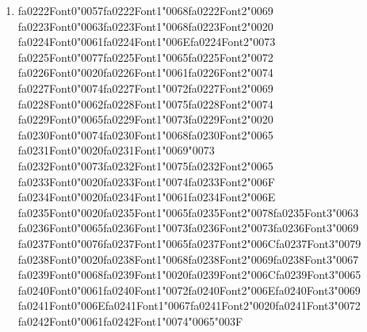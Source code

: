 \documentclass[12pt]{article}
\begin{document}
\begin{enumerate}[label=Q\arabic*.]
 \item {\csname fa0222Font0\endcsname\char"0057}{\csname fa0222Font1\endcsname\char"0068}{\csname fa0222Font2\endcsname\char"0069} {\csname fa0223Font0\endcsname\char"0063}{\csname fa0223Font1\endcsname\char"0068}{\csname fa0223Font2\endcsname\char"0020} {\csname fa0224Font0\endcsname\char"0061}{\csname fa0224Font1\endcsname\char"006E}{\csname fa0224Font2\endcsname\char"0073} {\csname fa0225Font0\endcsname\char"0077}{\csname fa0225Font1\endcsname\char"0065}{\csname fa0225Font2\endcsname\char"0072} {\csname fa0226Font0\endcsname\char"0020}{\csname fa0226Font1\endcsname\char"0061}{\csname fa0226Font2\endcsname\char"0074} {\csname fa0227Font0\endcsname\char"0074}{\csname fa0227Font1\endcsname\char"0072}{\csname fa0227Font2\endcsname\char"0069} {\csname fa0228Font0\endcsname\char"0062}{\csname fa0228Font1\endcsname\char"0075}{\csname fa0228Font2\endcsname\char"0074} {\csname fa0229Font0\endcsname\char"0065}{\csname fa0229Font1\endcsname\char"0073}{\csname fa0229Font2\endcsname\char"0020} {\csname fa0230Font0\endcsname\char"0074}{\csname fa0230Font1\endcsname\char"0068}{\csname fa0230Font2\endcsname\char"0065} {\csname fa0231Font0\endcsname\char"0020}{\csname fa0231Font1\endcsname\char"0069}{\char"0073} {\csname fa0232Font0\endcsname\char"0073}{\csname fa0232Font1\endcsname\char"0075}{\csname fa0232Font2\endcsname\char"0065} {\csname fa0233Font0\endcsname\char"0020}{\csname fa0233Font1\endcsname\char"0074}{\csname fa0233Font2\endcsname\char"006F} {\csname fa0234Font0\endcsname\char"0020}{\csname fa0234Font1\endcsname\char"0061}{\csname fa0234Font2\endcsname\char"006E} {\csname fa0235Font0\endcsname\char"0020}{\csname fa0235Font1\endcsname\char"0065}{\csname fa0235Font2\endcsname\char"0078}{\csname fa0235Font3\endcsname\char"0063} {\csname fa0236Font0\endcsname\char"0065}{\csname fa0236Font1\endcsname\char"0073}{\csname fa0236Font2\endcsname\char"0073}{\csname fa0236Font3\endcsname\char"0069} {\csname fa0237Font0\endcsname\char"0076}{\csname fa0237Font1\endcsname\char"0065}{\csname fa0237Font2\endcsname\char"006C}{\csname fa0237Font3\endcsname\char"0079} {\csname fa0238Font0\endcsname\char"0020}{\csname fa0238Font1\endcsname\char"0068}{\csname fa0238Font2\endcsname\char"0069}{\csname fa0238Font3\endcsname\char"0067} {\csname fa0239Font0\endcsname\char"0068}{\csname fa0239Font1\endcsname\char"0020}{\csname fa0239Font2\endcsname\char"006C}{\csname fa0239Font3\endcsname\char"0065} {\csname fa0240Font0\endcsname\char"0061}{\csname fa0240Font1\endcsname\char"0072}{\csname fa0240Font2\endcsname\char"006E}{\csname fa0240Font3\endcsname\char"0069} {\csname fa0241Font0\endcsname\char"006E}{\csname fa0241Font1\endcsname\char"0067}{\csname fa0241Font2\endcsname\char"0020}{\csname fa0241Font3\endcsname\char"0072} {\csname fa0242Font0\endcsname\char"0061}{\csname fa0242Font1\endcsname\char"0074}{\char"0065}{\char"003F}

\end{enumerate}
\end{document}

